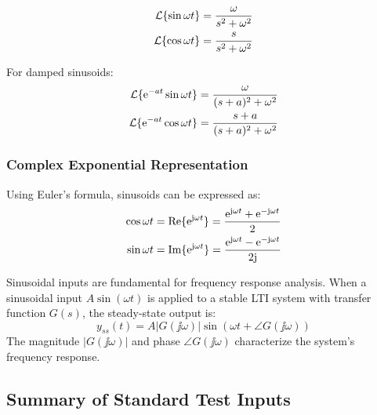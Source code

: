 \begin{align}
\mathcal{L}\{\sin\omega t\} &= \frac{\omega}{s^2 + \omega^2} \\
\mathcal{L}\{\cos\omega t\} &= \frac{s}{s^2 + \omega^2}
\end{align}

For damped sinusoids:
\begin{align}
\mathcal{L}\{\mathrm{e}^{-at}\sin\omega t\} &= \frac{\omega}{(s+a)^2 + \omega^2} \\
\mathcal{L}\{\mathrm{e}^{-at}\cos\omega t\} &= \frac{s+a}{(s+a)^2 + \omega^2}
\end{align}

\subsubsection{Complex Exponential Representation}

Using Euler's formula, sinusoids can be expressed as:
\begin{align}
\cos\omega t &= \operatorname{Re}\{\mathrm{e}^{\mathrm{j}\omega t}\} = \frac{\mathrm{e}^{\mathrm{j}\omega t} + \mathrm{e}^{-\mathrm{j}\omega t}}{2} \\
\sin\omega t &= \operatorname{Im}\{\mathrm{e}^{\mathrm{j}\omega t}\} = \frac{\mathrm{e}^{\mathrm{j}\omega t} - \mathrm{e}^{-\mathrm{j}\omega t}}{2\mathrm{j}}
\end{align}

\begin{note}
Sinusoidal inputs are fundamental for frequency response analysis. When a sinusoidal input $A\sin(\omega t)$ is applied to a stable LTI system with transfer function $G(s)$, the steady-state output is:
\begin{equation}
y_{ss}(t) = A|G(\jj\omega)|\sin(\omega t + \angle G(\jj\omega))
\end{equation}
The magnitude $|G(\jj\omega)|$ and phase $\angle G(\jj\omega)$ characterize the system's frequency response.
\end{note}

\subsection{Summary of Standard Test Inputs}

